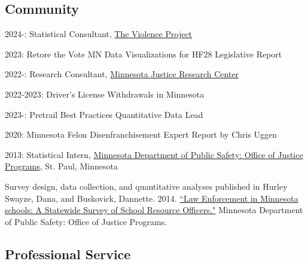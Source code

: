 \documentclass[letterpaper]{article}
\renewenvironment{itemize}{
  \begin{list}{}{
    \setlength{\leftmargin}{1.5em}
  }
}{
  \end{list}
}
\begin{document}
\subsection*{Community}

\begin{itemize}

\item 2024-: Statistical Consultant, \href{https://www.theviolenceproject.org/}{The Violence Project}
\item 2023: Retore the Vote MN Data Visualizations for HF28 Legislative Report
\item 2022-: Research Consultant, \href{https://www.mnjrc.org/about-us}{Minnesota Justice Research Center}

\begin{itemize}

\item 2022-2023: Driver's License Withdrawals in Minnesota
\item 2023-: Pretrail Best Practices Quantitative Data Lead

\end{itemize}

\item 2020: Minnesota Felon Disenfranchisement Expert Report by Chris Uggen 

\item 2013: Statistical Intern, \href{https://dps.mn.gov/divisions/ojp/statistical-analysis-center/Pages/default.aspx}{Minnesota Department of Public Safety: Office of Justice Programs}, St. Paul, Minnesota
\begin{itemize}
	\item Survey design, data collection, and quantitative analyses published in Hurley Swayze, Dana, and  Buskovick, Dannette. 2014. \href{https://dps.mn.gov/divisions/ojp/forms-documents/Documents/SRO20REPORT.pdf}{``Law Enforcement in Minnesota schools: A Statewide Survey of School Resource Officers."} Minnesota Department of Public Safety: Office of Justice Programs.
\end{itemize}

\end{itemize}

\subsection*{Professional Service}
\end{document}
